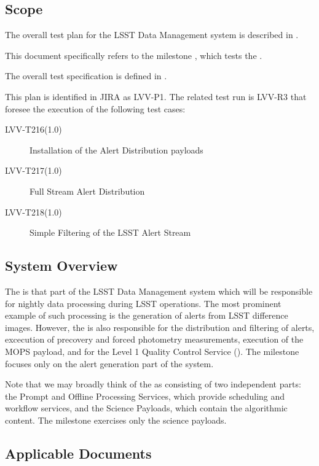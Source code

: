\documentclass[DM,lsstdraft,STR,toc]{lsstdoc}
\begin{document}
\subsection{Scope}
\label{sect:scope}

The overall test plan for the LSST Data Management system is described in .

This document specifically refers to the milestone \milestoneId{}, which tests the \product{}.

The overall \product{} test specification is defined in .

This plan is identified in JIRA as LVV-P1. The related test run is LVV-R3 that foresee the 
execution of the following test cases:

\begin{description}

  \item[LVV-T216(1.0)]{Installation of the Alert Distribution payloads}
  \item[LVV-T217(1.0)]{Full Stream Alert Distribution}
  \item[LVV-T218(1.0)]{Simple Filtering of the LSST Alert Stream}

\end{description}

\subsection{System Overview}
\label{sect:systemoverview}

The \product{} is that part of the LSST Data Management system which will be responsible for nightly data processing during LSST operations.
The most prominent example of such processing is the generation of alerts from LSST difference images.
However, the \product{} is also responsible for the distribution and filtering of alerts, excecution of precovery and forced photometry measurements, execution of the MOPS payload, and for the Level 1 Quality Control Service ().
The \milestoneId{} milestone focuses only on the alert generation part of the system.

Note that we may broadly think of the \product{} as consisting of two independent parts: the Prompt and Offline Processing Services, which provide scheduling and workflow services, and the Science Payloads, which contain the algorithmic content.
The \milestoneId{} milestone exercises only the science payloads.


\subsection{Applicable Documents}
\label{sect:appdocs}
\addtocounter{table}{-1}
\end{document}
